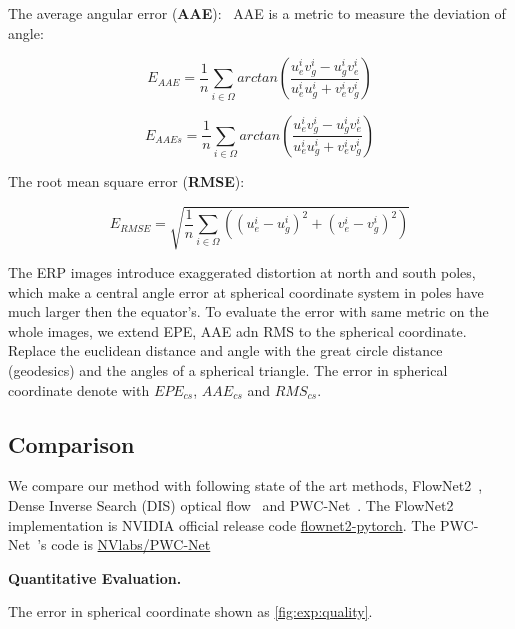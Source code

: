 The average angular error (\textbf{AAE}):~\cite{??}
AAE is a metric to measure the deviation of angle:

\begin{equation}\label{equ_exp_aae}
	E_{AAE} = \frac{1}{n} \sum_{i \in \Omega}arctan(\frac{u^i_e v^i_g - u^i_g v^i_e}{u^i_e u^i_g + v^i_e v^i_g})
\end{equation}

\begin{equation}\label{equ_exp_aae_sp}
	E_{AAEs} = \frac{1}{n} \sum_{i \in \Omega}arctan(\frac{u^i_e v^i_g - u^i_g v^i_e}{u^i_e u^i_g + v^i_e v^i_g})
\end{equation}

The root mean square error (\textbf{RMSE}):~\cite{??}


\begin{equation}\label{equ_exp_rmse}
	E_{RMSE} = \sqrt{\frac{1}{n} \sum_{i \in \Omega}((u_e^i - u_g^i)^2 + (v_e^i - v_g^i)^2)}
\end{equation}

The ERP images introduce exaggerated distortion at north and south poles, which make a central angle error at spherical coordinate system in poles have much larger then the equator's.
To evaluate the error with same metric on the whole images, we extend EPE, AAE adn RMS to the spherical coordinate. 
Replace the euclidean distance and angle with the great circle distance (geodesics) and the angles of a spherical triangle. 
The error in spherical coordinate denote with $EPE_{cs}$, $AAE_{cs}$ and $RMS_{cs}$.

\subsection{Comparison}

We compare our method with following state of the art methods, FlowNet2~\cite{IlgMSKDB2017}, Dense Inverse Search (DIS) optical flow~\cite{KroegTDV2016} and PWC-Net~\cite{SunYLK2018}. 
The FlowNet2~\cite{IlgMSKDB2017} implementation is NVIDIA official release code \href{https://github.com/NVIDIA/flownet2-pytorch}{flownet2-pytorch}.
The PWC-Net~\cite{SunYLK2018}'s code is \href{https://github.com/NVlabs/PWC-Net}{NVlabs/PWC-Net}


\textbf{Quantitative Evaluation.}


The error in spherical coordinate shown as \cref{fig:exp:quality}.

